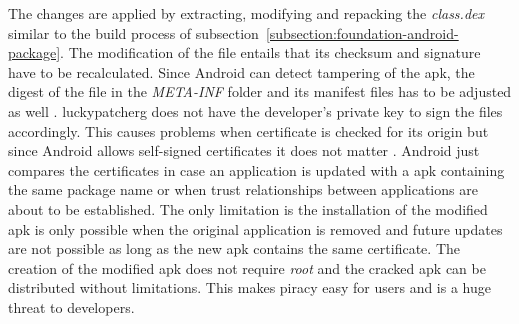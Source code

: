The changes are applied by extracting, modifying and repacking the \textit{class.dex} similar to the build process of subsection~\ref{subsection:foundation-android-package}.
The modification of the file entails that its checksum and signature have to be recalculated.
Since Android can detect tampering of the \gls{apk}, the digest of the file in the \textit{META-INF} folder and its manifest files has to be adjusted as well \cite{androidSigning}.
\gls{luckypatcherg} does not have the developer's private key to sign the files accordingly.
This causes problems when certificate is checked for its origin but since Android allows self-signed certificates it does not matter \cite{codeSigning}.
Android just compares the certificates in case an application is updated with a \gls{apk} containing the same package name or when trust relationships between applications are about to be established. \cite{androidSigning}
The only limitation is the installation of the modified \gls{apk} is only possible when the original application is removed and future updates are not possible as long as the new \gls{apk} contains the same certificate.
\newline
The creation of the modified \gls{apk} does not require \textit{root} and the cracked \gls{apk} can be distributed without limitations.
This makes piracy easy for users and is a huge threat to developers.
